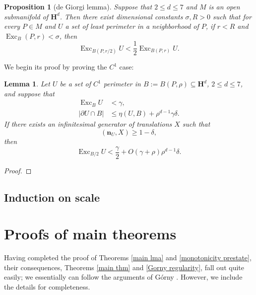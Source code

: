 \documentclass[reqno,10pt]{amsart}
\newcommand{\Hyp}{\mathbf H}
\DeclareMathOperator{\Exc}{Exc}
\newcommand{\normal}{\mathbf n}
\newtheorem{lemma}[theorem]{Lemma}
\newtheorem{proposition}[theorem]{Proposition}
\theoremstyle{definition}
\numberwithin{equation}{section}
\begin{document}
\begin{proposition}[de Giorgi lemma]\label{dGL final}
Suppose that $2 \leq d \leq 7$ and $M$ is an open submanifold of $\Hyp^d$.
Then there exist dimensional constants $\sigma, R > 0$ such that for every $P \in M$ and $U$ a set of least perimeter in a neighborhood of $P$, if $r < R$ and $\Exc_B(P, r) < \sigma$, then
$$\Exc_{B(P, r/2)} U < \frac{1}{2} \Exc_{B(P, r)} U.$$
\end{proposition}

We begin its proof by proving the $C^1$ case:

\begin{lemma}\label{dGL C1}
Let $U$ be a set of $C^1$ perimeter in $B := B(P, \rho) \subseteq \Hyp^d$, $2 \leq d \leq 7$, and suppose that
\begin{align}
\Exc_B U &< \gamma, \label{dGL C1 hyp1} \\
|\partial U \cap B| &\leq \eta(U, B) + \rho^{d - 1}\gamma\delta. \label{dGL C1 hyp2}
\end{align}
If there exists an infinitesimal generator of translations $X$ such that 
\begin{equation}
(\normal_U, X) \geq 1 - \delta, \label{dGL C1 hyp3}
\end{equation}
then
\begin{equation}
\Exc_{B/2} U < \frac{\gamma}{2} + O(\gamma + \rho)\rho^{d - 1}\delta. \label{dGL C1 concl}
\end{equation}
\end{lemma}
\begin{proof}

\end{proof}




\subsection{Induction on scale}


\section{Proofs of main theorems}\label{GornySec}
Having completed the proof of Theorems \ref{main lma} and \ref{monotonicity prestate}, their consequences, Theorems \ref{main thm} and \ref{Gorny regularity}, fall out quite easily; we essentially can follow the arguments of G\'orny \cite{górny2017planar}.
However, we include the details for completeness.
\end{document}
